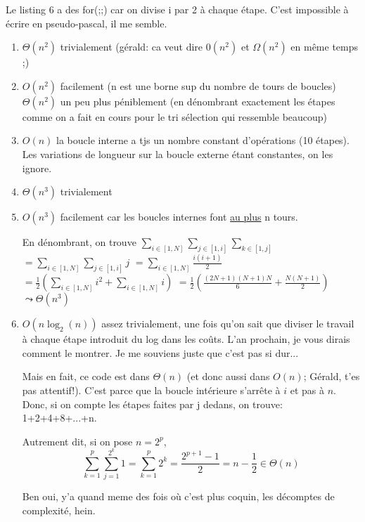 \documentclass[10pt]{article}\usepackage[correction]{esial}
\begin{document}
\begin{Reponse}
  Le listing 6 a des for(;;) car on divise i par 2 à chaque étape. C'est
  impossible à écrire en pseudo-pascal, il me semble.
  
  \begin{enumerate}
  \item $\Theta(n^2)$ trivialement (gérald: ca veut dire $0(n^2)$ et
    $\Omega(n^2)$ en même temps ;)
  \item $O(n^2)$ facilement (n est une borne sup du nombre de tours de
    boucles)\\
    $\Theta(n^2)$ un peu plus péniblement (en dénombrant exactement les étapes
    comme on a fait en cours pour le tri sélection qui ressemble beaucoup)
  \item $O(n)$ la boucle interne a tjs un nombre constant d'opérations (10
    étapes). Les variations de longueur sur la boucle externe étant constantes,
    on les ignore.
  \item $\Theta(n^3)$ trivialement
  \item $O(n^3)$ facilement car les boucles internes font \underline{au plus} n
    tours.

    En dénombrant, on trouve 
    $\displaystyle \sum_{i\in[1,N]}\sum_{j\in[1,i]}\sum_{k\in[1,j]}$
    $=\displaystyle\sum_{i\in[1,N]}\sum_{j\in[1,i]}j$
    $=\displaystyle\sum_{i\in[1,N]}\frac{i(i+1)}{2}$
    $=\frac{1}{2}\left(\displaystyle\sum_{i\in[1,N]}i^2+\sum_{i\in[1,N]}i\right)$
    $=\frac{1}{2}\left(\frac{(2N+1)(N+1)N}{6}+\frac{N(N+1)}{2}\right)$
    $\leadsto \Theta(n^3)$
  \item $O(n \log_2(n))$ assez trivialement, une fois qu'on sait que diviser le
    travail à chaque étape introduit du log dans les coûts. L'an prochain, je
    vous dirais comment le montrer. Je me souviens juste que c'est pas si
    dur...
    
    Mais en fait, ce code est dans $\Theta(n)$ (et donc aussi dans $O(n)$;
    Gérald, t'es pas attentif!). C'est parce que la boucle intérieure s'arrête
    à $i$ et pas à $n$. Donc, si on compte les étapes faites par j dedans, on
    trouve: 1+2+4+8+...+n.

    Autrement dit, si on pose $n=2^p$, 
    $$\sum_{k=1}^{p} \sum_{j=1}^{2^k} 1 = 
    \sum_{k=1}^{p} 2^k = \frac{2^{p+1}-1}{2} = n-\frac{1}{2} \in \Theta(n)$$

    Ben oui, y'a quand meme des fois où c'est plus coquin, les décomptes de
    complexité, hein.
  \end{enumerate}
\end{Reponse}
\end{document}
